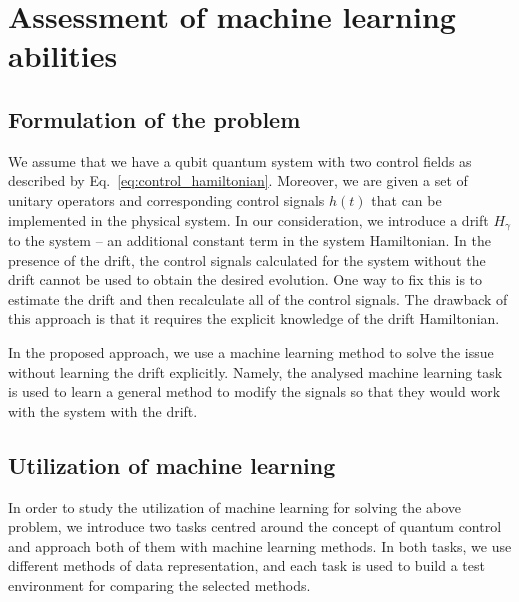 \documentclass[aps,pra,showkeys,showpacs,notitlepage,superscriptaddress]{revtex4-1}
\newcommand{\1}{{\rm 1\hspace{-0.9mm}l}}
\begin{document}
\section{Assessment of machine learning abilities}\label{sec:results}

\subsection{Formulation of the problem}


We assume that we have a qubit quantum system with two control fields as 
described by Eq.~\eqref{eq:control_hamiltonian}. Moreover, we are given a 
set of unitary operators and corresponding control signals $h(t)$ that can be implemented in the physical system. In our consideration, we 
introduce a drift $H_\gamma$ to the system -- an additional constant  
term in the system Hamiltonian. In the presence of the drift, the control  
signals calculated for the system without the drift cannot be used to obtain  
the desired evolution. One way to fix this is to estimate the drift and then  
recalculate all of the control signals. The drawback of this approach is that  
it requires the explicit knowledge of the drift Hamiltonian.

In the proposed approach, we use a machine learning method to solve the issue 
without learning the drift explicitly. Namely, the analysed machine learning  
task is used to learn a general method to modify the signals so that they would
work with the system with the drift.

\subsection{Utilization of machine learning}

In order to study the utilization of machine learning for solving the above
problem, we introduce two tasks centred around the concept of quantum control
and approach both of them with machine learning methods. In both tasks, we use
different methods of data representation, and each task is used to build a test
environment for comparing the selected methods.
\end{document}
